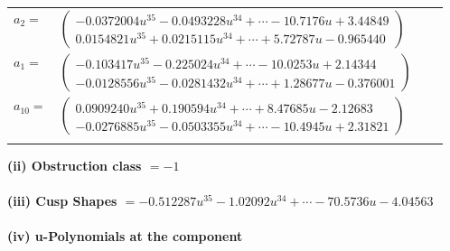 \documentclass[1p]{elsarticle_modified}
\theoremstyle{definition}
\begin{document}
\begin{tabular}{m{7pt} m{180pt} m{7pt} m{180pt} }
\flushright $a_{2}=$&$\begin{pmatrix}-0.0372004 u^{35}-0.0493228 u^{34}+\cdots-10.7176 u+3.44849\\0.0154821 u^{35}+0.0215115 u^{34}+\cdots+5.72787 u-0.965440\end{pmatrix}$ \\
\flushright $a_{1}=$&$\begin{pmatrix}-0.103417 u^{35}-0.225024 u^{34}+\cdots-10.0253 u+2.14344\\-0.0128556 u^{35}-0.0281432 u^{34}+\cdots+1.28677 u-0.376001\end{pmatrix}$ \\
\flushright $a_{10}=$&$\begin{pmatrix}0.0909240 u^{35}+0.190594 u^{34}+\cdots+8.47685 u-2.12683\\-0.0276885 u^{35}-0.0503355 u^{34}+\cdots-10.4945 u+2.31821\end{pmatrix}$\\&\end{tabular}
\flushleft \textbf{(ii) Obstruction class $= -1$}\\~\\
\flushleft \textbf{(iii) Cusp Shapes $= -0.512287 u^{35}-1.02092 u^{34}+\cdots-70.5736 u-4.04563$}\\~\\
\newpage\renewcommand{\arraystretch}{1}
\flushleft \textbf{(iv) u-Polynomials at the component}\newline \\
\end{document}
